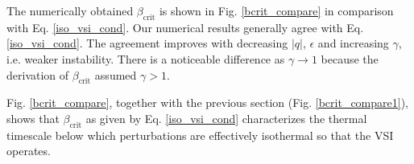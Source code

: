 The numerically obtained $\beta_\mathrm{crit}$ is shown in
Fig. \ref{bcrit_compare} in comparison with Eq. \ref{iso_vsi_cond}.
Our numerical results generally agree with Eq. \ref{iso_vsi_cond}. The
agreement improves with decreasing  $|q|$,  $\epsilon$ and increasing
$\gamma$, i.e. weaker instability. There is a noticeable difference
as $\gamma\to1$ because the derivation of $\beta_\mathrm{crit}$
assumed $\gamma>1$.   

Fig. \ref{bcrit_compare}, together with the previous section
(Fig. \ref{bcrit_compare1}), shows that $\beta_\mathrm{crit}$ as given
by Eq. \ref{iso_vsi_cond} characterizes the thermal timescale below
which perturbations are effectively isothermal 
so that the VSI operates. 



